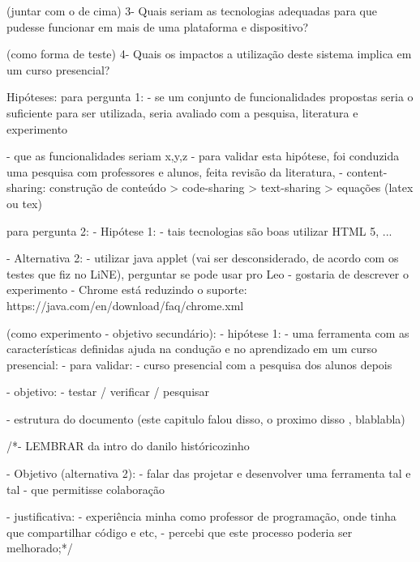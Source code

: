                     (juntar com o de cima) 3- Quais seriam as tecnologias adequadas para que pudesse funcionar em mais de uma plataforma e dispositivo?

                    (como forma de teste) 4- Quais os impactos a utilização deste sistema implica em um curso presencial?

                    Hipóteses:
                    para pergunta 1:
                        - se um conjunto de funcionalidades propostas seria o suficiente para ser utilizada, seria avaliado com a pesquisa, literatura e experimento

                        - que as funcionalidades seriam x,y,z
                            - para validar esta hipótese, foi conduzida uma pesquisa com professores e alunos, feita revisão da literatura, 
                        - content-sharing: construção de conteúdo > code-sharing > text-sharing > equações (latex ou tex)

                    para pergunta 2:
                        - Hipótese 1:
                            - tais tecnologias são boas utilizar HTML 5, ...

                            - Alternativa 2:
                                - utilizar java applet (vai ser desconsiderado, de acordo com os testes que fiz no LiNE), perguntar se pode usar pro Leo - gostaria de descrever o experimento
                                - Chrome está reduzindo o suporte:
                                    https://java.com/en/download/faq/chrome.xml

                    (como experimento - objetivo secundário):
                        - hipótese 1:
                            - uma ferramenta com as características definidas ajuda na condução e no aprendizado em um curso presencial:
                            - para validar:
                                - curso presencial com a pesquisa dos alunos depois

            - objetivo:
                - testar / verificar / pesquisar

            - estrutura do documento (este capitulo falou disso, o proximo disso , blablabla)

            /*- LEMBRAR da intro do danilo históricozinho


            - Objetivo (alternativa 2):
                - falar das projetar e desenvolver uma ferramenta tal e tal
                - que permitisse colaboração

                - justificativa:
                    - experiência minha como professor de programação, onde tinha que compartilhar código e etc,
                    - percebi que este processo poderia ser melhorado;*/

